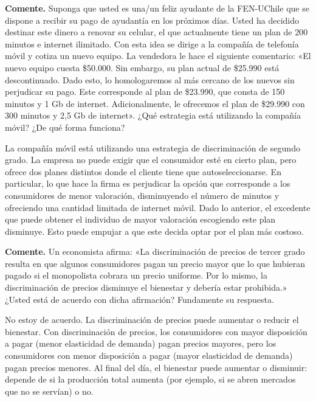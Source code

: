 \question \textbf{Comente.} Suponga que usted es una/un feliz ayudante de la FEN-UChile que se dispone a recibir su pago de ayudantía en los próximos días. Usted ha decidido destinar este dinero a renovar su celular, el que actualmente tiene un plan de 200 minutos e internet ilimitado. Con esta idea se dirige a la compañía de telefonía móvil y cotiza un nuevo equipo. La vendedora le hace el siguiente comentario: «El nuevo equipo cuesta \$50.000. Sin embargo, su plan actual de \$25.990 está descontinuado. Dado esto, lo homologaremos al más cercano de los nuevos sin perjudicar su pago. Este corresponde al plan de \$23.990, que consta de 150 minutos y 1 Gb de internet. Adicionalmente, le ofrecemos el plan de \$29.990 con 300 minutos y 2,5 Gb de internet». ¿Qué estrategia está utilizando la compañía móvil? ¿De qué forma funciona?
\begin{solution}
La compañía móvil está utilizando una estrategia de discriminación de segundo grado. La empresa no puede exigir que el consumidor esté en cierto plan, pero ofrece dos planes distintos donde el cliente tiene que autoseleccionarse. En particular, lo que hace la firma es perjudicar la opción que corresponde a los consumidores de menor valoración, disminuyendo el número de minutos y ofreciendo una cantidad limitada de internet móvil. Dado lo anterior, el excedente que puede obtener el individuo de mayor valoración escogiendo este plan disminuye. Esto puede empujar a que este decida optar por el plan más costoso.

\end{solution}

\question \textbf{Comente.} Un economista afirma: «La discriminación de precios de tercer grado resulta en que algunos consumidores pagan un precio mayor que lo que hubieran pagado si el monopolista cobrara un precio uniforme. Por lo mismo, la discriminación de precios disminuye el bienestar y debería estar prohibida.» ¿Usted está de acuerdo con dicha afirmación? Fundamente su respuesta.
\begin{solution}
No estoy de acuerdo. La discriminación de precios puede aumentar o reducir el bienestar. Con discriminación de precios, los consumidores con mayor disposición a pagar (menor elasticidad de demanda) pagan precios mayores, pero los consumidores con menor disposición a pagar (mayor elasticidad de demanda) pagan precios menores. Al final del día, el bienestar puede aumentar o disminuir: depende de si la producción total aumenta (por ejemplo, si se abren mercados que no se servían) o no.

\end{solution}

